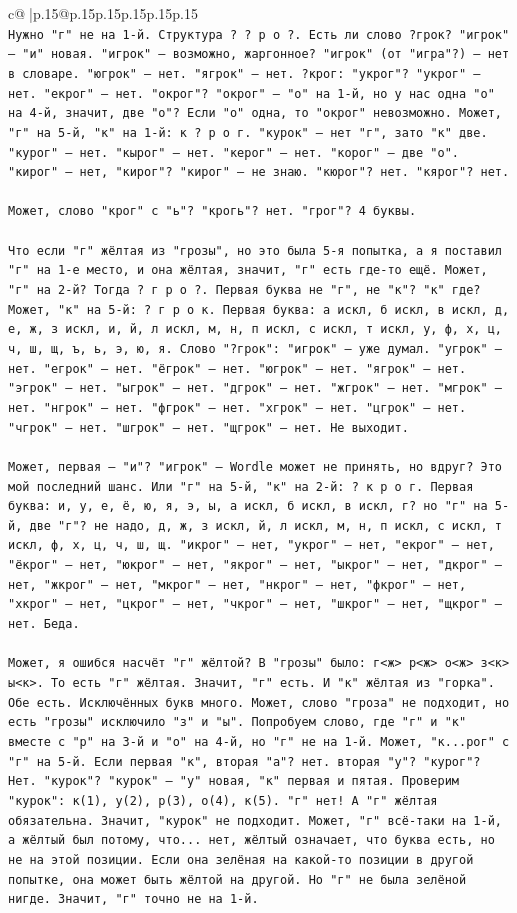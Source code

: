 \documentclass{article}
\begin{document}
{\begin{supertabular}{c@{$\;$}|p{.15\linewidth}@{}p{.15\linewidth}p{.15\linewidth}p{.15\linewidth}p{.15\linewidth}p{.15\linewidth}}
{{{\\ 
\texttt{Нужно "г" не на 1{-}й. Структура ? ? р о ?. Есть ли слово ?грок? "игрок" — "и" новая. "игрок" — возможно, жаргонное? "игрок" (от "игра"?) — нет в словаре. "югрок" — нет. "ягрок" — нет. ?крог: "укрог"? "укрог" — нет. "екрог" — нет. "окрог"? "окрог" — "о" на 1{-}й, но у нас одна "о" на 4{-}й, значит, две "о"? Если "о" одна, то "окрог" невозможно. Может, "г" на 5{-}й, "к" на 1{-}й: к ? р о г. "курок" — нет "г", зато "к" две. "курог" — нет. "кырог" — нет. "керог" — нет. "корог" — две "о". "кирог" — нет, "кирог"? "кирог" — не знаю. "кюрог"? нет. "кярог"? нет.} \\
\\ 
\texttt{Может, слово "крог" с "ь"? "крогь"? нет. "грог"? 4 буквы.} \\
\\ 
\texttt{Что если "г" жёлтая из "грозы", но это была 5{-}я попытка, а я поставил "г" на 1{-}е место, и она жёлтая, значит, "г" есть где{-}то ещё. Может, "г" на 2{-}й? Тогда ? г р о ?. Первая буква не "г", не "к"? "к" где? Может, "к" на 5{-}й: ? г р о к. Первая буква: а искл, б искл, в искл, д, е, ж, з искл, и, й, л искл, м, н, п искл, с искл, т искл, у, ф, х, ц, ч, ш, щ, ъ, ь, э, ю, я. Слово "?грок": "игрок" — уже думал. "угрок" — нет. "егрок" — нет. "ёгрок" — нет. "югрок" — нет. "ягрок" — нет. "эгрок" — нет. "ыгрок" — нет. "дгрок" — нет. "жгрок" — нет. "мгрок" — нет. "нгрок" — нет. "фгрок" — нет. "хгрок" — нет. "цгрок" — нет. "чгрок" — нет. "шгрок" — нет. "щгрок" — нет. Не выходит.} \\
\\ 
\texttt{Может, первая — "и"? "игрок" — Wordle может не принять, но вдруг? Это мой последний шанс. Или "г" на 5{-}й, "к" на 2{-}й: ? к р о г. Первая буква: и, у, е, ё, ю, я, э, ы, а искл, б искл, в искл, г? но "г" на 5{-}й, две "г"? не надо, д, ж, з искл, й, л искл, м, н, п искл, с искл, т искл, ф, х, ц, ч, ш, щ. "икрог" — нет, "укрог" — нет, "екрог" — нет, "ёкрог" — нет, "юкрог" — нет, "якрог" — нет, "ыкрог" — нет, "дкрог" — нет, "жкрог" — нет, "мкрог" — нет, "нкрог" — нет, "фкрог" — нет, "хкрог" — нет, "цкрог" — нет, "чкрог" — нет, "шкрог" — нет, "щкрог" — нет. Беда.} \\
\\ 
\texttt{Может, я ошибся насчёт "г" жёлтой? В "грозы" было: г<ж> р<ж> о<ж> з<к> ы<к>. То есть "г" жёлтая. Значит, "г" есть. И "к" жёлтая из "горка". Обе есть. Исключённых букв много. Может, слово "гроза" не подходит, но есть "грозы" исключило "з" и "ы". Попробуем слово, где "г" и "к" вместе с "р" на 3{-}й и "о" на 4{-}й, но "г" не на 1{-}й. Может, "к...рог" с "г" на 5{-}й. Если первая "к", вторая "а"? нет. вторая "у"? "курог"? Нет. "курок"? "курок" — "у" новая, "к" первая и пятая. Проверим "курок": к(1), у(2), р(3), о(4), к(5). "г" нет! А "г" жёлтая обязательна. Значит, "курок" не подходит. Может, "г" всё{-}таки на 1{-}й, а жёлтый был потому, что... нет, жёлтый означает, что буква есть, но не на этой позиции. Если она зелёная на какой{-}то позиции в другой попытке, она может быть жёлтой на другой. Но "г" не была зелёной нигде. Значит, "г" точно не на 1{-}й.} \\
}}}
\end{supertabular}}
\end{document}
